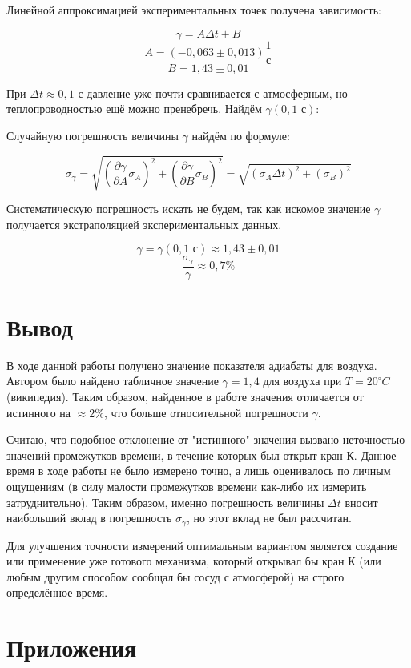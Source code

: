 \documentclass[15pt,a5paper,reqno]{article}
\begin{document}
    Линейной аппроксимацией экспериментальных точек получена зависимость:
    
        \[\gamma = A\Delta t + B\]
        \[A = (-0,063 \pm 0,013) \frac{1}{\text{с}}\]
        \[B = 1,43 \pm 0,01\]
        
    При $\Delta t \approx 0,1\text{ с}$ давление уже почти сравнивается с атмосферным, но теплопроводностью ещё можно пренебречь. Найдём $\gamma (0,1\text{ с})$:
    
    Случайную погрешность величины $\gamma$ найдём по формуле:
    
    \[\sigma_\gamma = \sqrt{\left(\frac{\partial\gamma}{\partial A} \sigma_A\right)^2 + \left(\frac{\partial\gamma}{\partial B} \sigma_B\right)^2} = \sqrt{\left(\sigma_A \Delta t\right)^2 + \left(\sigma_B\right)^2}\]
    
    Систематическую погрешность искать не будем, так как искомое значение $\gamma$ получается экстраполяцией экспериментальных данных.
    
    \[\gamma = \gamma(0,1\text{ с}) \approx 1,43 \pm 0,01\]
    \[\frac{\sigma_\gamma}{\gamma}\approx 0,7\%\]
    
\section{Вывод}

    В ходе данной работы получено значение показателя адиабаты для воздуха. Автором было найдено табличное значение $\gamma = 1,4$ для воздуха при $T = 20^{\circ} C$ (википедия). Таким образом, найденное в работе значения отличается от истинного на $\approx 2\%$, что больше относительной погрешности $\gamma$.
    
    Считаю, что подобное отклонение от "истинного"\> значения вызвано неточностью значений промежутков времени, в течение которых был открыт кран К. Данное время в ходе работы не было измерено точно, а лишь оценивалось по личным ощущениям (в силу малости промежутков времени как-либо их измерить затруднительно). Таким образом, именно погрешность величины $\Delta t$ вносит наибольший вклад в погрешность $\sigma_\gamma$, но этот вклад не был рассчитан.
    
    Для улучшения точности измерений оптимальным вариантом является создание или применение уже готового механизма, который открывал бы кран К (или любым другим способом сообщал бы сосуд с атмосферой) на строго определённое время.
    
\section{Приложения}
\end{document}
